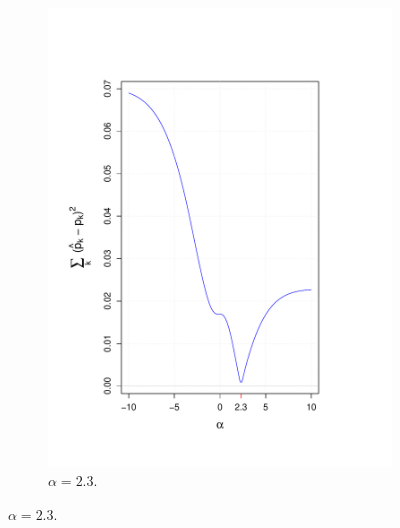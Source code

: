 \documentclass[10pt]{article}
\begin{document}
\begin{figure}[H]
\begin{subfigure}{.25\textwidth}
  \includegraphics[width=\linewidth]{alpha_trace_2_3_shift_0_2_scale_0_8.pdf}
  \caption{ $\alpha = 2.3$.}
  \label{fig: alpha_shift_and_scale}
\end{subfigure}%
\end{figure}
\end{document}
